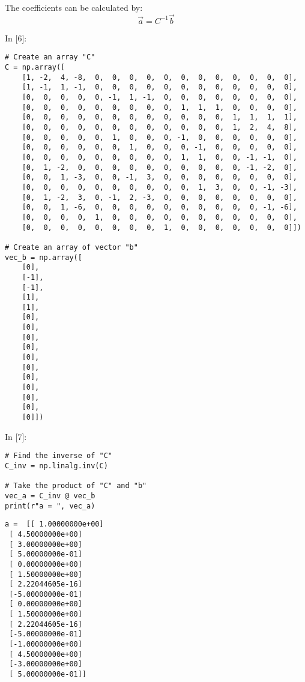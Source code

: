 \documentclass[11pt]{article}
\newif\ifcode
\newif\ifleftmargins
\newlength{\promptlength}
\newcommand{\prompt}[3]{
        \needspace{1.1cm}
        \settowidth{\promptlength}{ #1 [#3] }
        \ifleftmargins\hspace{-\promptlength}\hspace{-5pt}\fi
        {\color{#2}#1 [#3]:}
        \ifleftmargins\vspace{-2.7ex}\fi
    }
\begin{document}
    The coefficients can be calculated by: \[\vec{a} = C^{-1} \vec{b}\]

    
\prompt{In}{incolor}{6}
\codetrue
\begin{tcolorbox}[breakable, size=fbox, boxrule=1pt, pad at break*=1mm, colback=cellbackground, colframe=cellborder]
\begin{verbatim}
# Create an array "C"
C = np.array([
    [1, -2,  4, -8,  0,  0,  0,  0,  0,  0,  0,  0,  0,  0,  0,  0],
    [1, -1,  1, -1,  0,  0,  0,  0,  0,  0,  0,  0,  0,  0,  0,  0],
    [0,  0,  0,  0,  0, -1,  1, -1,  0,  0,  0,  0,  0,  0,  0,  0],
    [0,  0,  0,  0,  0,  0,  0,  0,  0,  1,  1,  1,  0,  0,  0,  0], 
    [0,  0,  0,  0,  0,  0,  0,  0,  0,  0,  0,  0,  1,  1,  1,  1], 
    [0,  0,  0,  0,  0,  0,  0,  0,  0,  0,  0,  0,  1,  2,  4,  8],  
    [0,  0,  0,  0,  0,  1,  0,  0,  0, -1,  0,  0,  0,  0,  0,  0], 
    [0,  0,  0,  0,  0,  0,  1,  0,  0,  0, -1,  0,  0,  0,  0,  0],  
    [0,  0,  0,  0,  0,  0,  0,  0,  0,  1,  1,  0,  0, -1, -1,  0], 
    [0,  1, -2,  0,  0,  0,  0,  0,  0,  0,  0,  0,  0, -1, -2,  0],
    [0,  0,  1, -3,  0,  0, -1,  3,  0,  0,  0,  0,  0,  0,  0,  0], 
    [0,  0,  0,  0,  0,  0,  0,  0,  0,  0,  1,  3,  0,  0, -1, -3], 
    [0,  1, -2,  3,  0, -1,  2, -3,  0,  0,  0,  0,  0,  0,  0,  0], 
    [0,  0,  1, -6,  0,  0,  0,  0,  0,  0,  0,  0,  0,  0, -1, -6], 
    [0,  0,  0,  0,  1,  0,  0,  0,  0,  0,  0,  0,  0,  0,  0,  0], 
    [0,  0,  0,  0,  0,  0,  0,  0,  1,  0,  0,  0,  0,  0,  0,  0]])

# Create an array of vector "b"
vec_b = np.array([
    [0],
    [-1],
    [-1],
    [1], 
    [1], 
    [0],  
    [0], 
    [0],  
    [0], 
    [0],
    [0], 
    [0], 
    [0], 
    [0], 
    [0], 
    [0]])
\end{verbatim}
\end{tcolorbox}
\codefalse

    
\prompt{In}{incolor}{7}
\codetrue
\begin{tcolorbox}[breakable, size=fbox, boxrule=1pt, pad at break*=1mm, colback=cellbackground, colframe=cellborder]
\begin{verbatim}
# Find the inverse of "C"
C_inv = np.linalg.inv(C)

# Take the product of "C" and "b"
vec_a = C_inv @ vec_b
print(r"a = ", vec_a)
\end{verbatim}
\end{tcolorbox}
\codefalse

    \begin{Verbatim}[commandchars=\\\{\}]
a =  [[ 1.00000000e+00]
 [ 4.50000000e+00]
 [ 3.00000000e+00]
 [ 5.00000000e-01]
 [ 0.00000000e+00]
 [ 1.50000000e+00]
 [ 2.22044605e-16]
 [-5.00000000e-01]
 [ 0.00000000e+00]
 [ 1.50000000e+00]
 [ 2.22044605e-16]
 [-5.00000000e-01]
 [-1.00000000e+00]
 [ 4.50000000e+00]
 [-3.00000000e+00]
 [ 5.00000000e-01]]

    \end{Verbatim}
\end{document}
